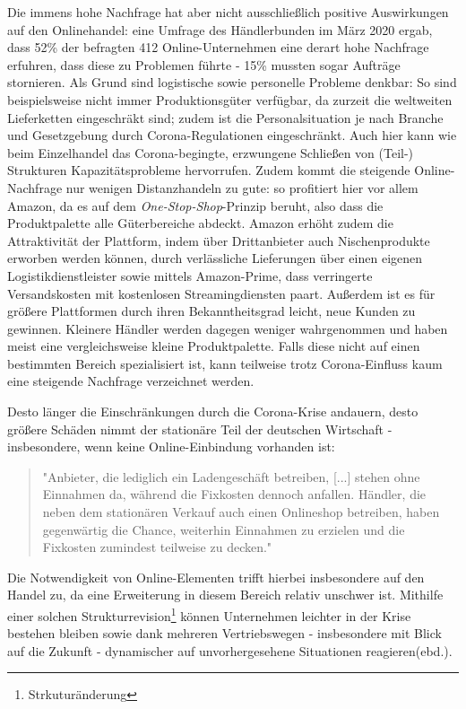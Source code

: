 \begin{folding}

Die immens hohe Nachfrage hat aber nicht ausschließlich positive Auswirkungen auf den Onlinehandel: eine Umfrage des Händlerbunden im März 2020 ergab, dass 52\% der befragten 412 Online-Unternehmen eine derart hohe Nachfrage erfuhren, dass diese zu Problemen führte - 15\% mussten sogar Aufträge stornieren. Als Grund sind logistische sowie personelle Probleme denkbar: So sind beispielsweise nicht immer Produktionsgüter verfügbar, da zurzeit die weltweiten Lieferketten eingeschräkt sind\cite{corona-wettbewerb}; zudem ist die Personalsituation je nach Branche und Gesetzgebung durch Corona-Regulationen eingeschränkt\cite{haendlerbund-studie}. Auch hier kann wie beim Einzelhandel das Corona-begingte, erzwungene Schließen von (Teil-) Strukturen Kapazitätsprobleme hervorrufen. Zudem kommt die steigende Online-Nachfrage nur wenigen Distanzhandeln zu gute: so profitiert hier vor allem Amazon, da es auf dem \emph{One-Stop-Shop}-Prinzip beruht, also dass die Produktpalette alle Güterbereiche abdeckt. Amazon erhöht zudem die Attraktivität der Plattform, indem über Drittanbieter auch Nischenprodukte erworben werden können, durch verlässliche Lieferungen über einen eigenen Logistikdienstleister sowie mittels Amazon-Prime, dass verringerte Versandskosten mit kostenlosen Streamingdiensten paart. Außerdem ist es für größere Plattformen durch ihren Bekanntheitsgrad leicht, neue Kunden zu gewinnen. Kleinere Händler werden dagegen weniger wahrgenommen und haben meist eine vergleichsweise kleine Produktpalette. Falls diese nicht auf einen bestimmten Bereich spezialisiert ist, kann teilweise trotz Corona-Einfluss kaum eine steigende Nachfrage verzeichnet werden\cite{corona-amazon}.

Desto länger die Einschränkungen durch die Corona-Krise andauern, desto größere Schäden nimmt der stationäre Teil der deutschen Wirtschaft - insbesondere, wenn keine Online-Einbindung vorhanden ist: 
 
\begin{quote}
    "Anbieter, die lediglich ein Ladengeschäft betreiben, [...] stehen  ohne  Einnahmen  da,  während  die  Fixkosten  dennoch  anfallen.  Händler,  die  neben  dem  stationären  Verkauf  auch  einen  Onlineshop  betreiben,  haben  gegenwärtig  die  Chance,  weiterhin  Einnahmen  zu erzielen und die Fixkosten zumindest teilweise zu decken."\cite{corona-wettbewerb}
\end{quote}
Die Notwendigkeit von Online-Elementen trifft hierbei insbesondere auf den Handel zu, da eine Erweiterung in diesem Bereich relativ unschwer ist. Mithilfe einer solchen Strukturrevision\footnote{Strkuturänderung} können Unternehmen leichter in der Krise bestehen bleiben sowie dank mehreren Vertriebswegen - insbesondere mit Blick auf die Zukunft - dynamischer auf unvorhergesehene Situationen reagieren(ebd.).
 
\end{folding}




